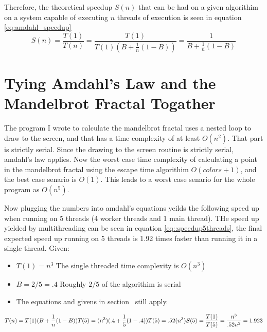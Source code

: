 \documentclass[10pt,oneside,letter]{article}
\begin{document}
Therefore, the theoretical speedup $S(n)$ that can be had on a given algorithim
on a system capable of executing $n$ threads of execution is seen in equation
\eqref{eq:amdahl_speedup}
\begin{equation} \label{eq:amdahl_speedup}
    S(n) = \frac{T(1)}{T(n)}
         = \frac{T(1)}{T(1)(B+\frac{1}{n}(1-B))}
         = \frac{1}{B+\frac{1}{n}(1-B)}
\end{equation}

\section{Tying Amdahl's Law and the Mandelbrot Fractal Togather}
The program I wrote to calculate the mandelbrot fractal uses a nested loop to
draw to the screen, and that has a time complexity of at least $O(n^2)$. That
part is strictly serial. Since the drawing to the screen routine is strictly
serial, amdahl's law applies. Now the worst case time complexity of calculating a
point in the mandelbrot fractal using the escape time algorithim $O({colors} + 1)$,
and the best case senario is $O(1)$. This leads to a worst case senario for the
whole program as $O(n^5)$.

Now plugging the numbers into amdahl's equations yeilds the following speed up
when running on 5 threads (4 worker threads and 1 main thread). THe speed up
yielded by multithreading can be seen in equation \eqref{eq::speedup5threads},
the final expected speed up running on 5 threads is 1.92 times faster than running
it in a single thread.
Given:
\begin{itemize}
    \item $T(1) = n^3$ The single threaded time complexity is $O(n^3)$
    \item $B = 2/5 = .4$ Roughly $2/5$ of the algorithim is serial
    \item The equations and givens in section~\pageref{sec:Ahmdahl's Law} still apply.
\end{itemize}

\begin{equation} \label{eq:speedup5threads}
    T(n) = T(1)(B + \frac{1}{n}(1-B))\\
    T(5) = (n^3)(.4 + \frac{1}{5}(1-.4))\\
    T(5) = .52(n^3)\\
    S(5) = \frac{T(1)}{T(5)} = \frac{n^3}{.52n^3} = 1.923
\end{equation}
\end{document}
